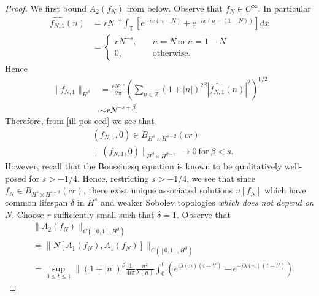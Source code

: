 \documentclass[12pt,reqno]{amsart}
\numberwithin{equation}{section}  %
\newcommand{\zz}{\mathbb{Z}}
\newcommand{\ci}{\mathbb{T}}
\newcommand{\wh}{\widehat}
\begin{document}
%
%
%
%
%
%
%
\begin{proof}
  We first bound $A_{2}(f_{N})$ from below.
  Observe that $f_{N} \in C^{\infty}$. In particular
%
%
\begin{equation}
  \label{ill-pos-ce}
\begin{split}
  \wh{f_{N,1}}(n)
  & = r N^{-s}\int_{\ci} [e^{-ix(n - N)} + e^{-ix(n - (1-N))}]  dx  
  \\ 
  & = 
  \begin{cases}
    r N^{-s},  \quad  & n = N \ \text{or} \ n = 1-N
    \\
     0, \quad  & \text{otherwise}.
  \end{cases}
\end{split}
\end{equation}
%
Hence
%
%
\begin{equation}
  \label{ill-pos-ced}
\begin{split}
  \| f_{N,1} \|_{H^{\beta}}
  & = \frac{rN^{-s}}{2 \pi} \left( \sum_{n \in \zz} (1 + | n |)^{2 \beta} |
  \wh{f_{N,1}}(n) |^{2} \right)^{1/2}
  \\
  & \sim rN^{-s + \beta}.
\end{split}
\end{equation}
%
%
Therefore, from \eqref{ill-pos-ced} we see that 
\begin{equation*}
  \begin{split}
    & (f_{N,1}, 0) \in B_{H^{s} \times H^{s-2}}(cr)  
    \\
    & \|(f_{N,1}, 0)\|_{H^{\beta} \times H^{\beta -2}} \to 0 \ \text{for} \ \beta < s.
    \end{split}
\end{equation*}
However, recall that the Boussinesq equation is known to be qualitatively well-posed for $s > -1/4$. Hence, restricting $s > -1/4$, we see that since $f_{N} \in B_{H^{s} \times H^{s-2}}(cr)$, there exist unique associated 
solutions $u[f_{N}]$ which have common lifespan $\delta$ in $H^{s}$ and weaker Sobolev topologies \emph{which does not depend
on $N$}. Choose $r$ sufficiently small such that $\delta =1$.  
Observe that
%
%
\begin{equation*}
\begin{split}
& \| A_{2}(f_{N}) \|_{C([0, 1], H^{\beta})} 
\\
  &  =  \| N[A_{1}(f_{N}), A_{1}(f_{N})] \|_{C([0, 1],
  H^{\beta})} 
  \\
  & = \sup_{0 \le t \le 1} \|  (1 + | n |)^{\beta}
  \frac{1}{4 i \pi} \frac{n^{2}}{\lambda(n)}
  \int_{0}^{t} \left( e^{i\lambda(n)(t-t')} - e^{-i\lambda(n)(t-t')} \right)

\end{split}
\end{equation*}
\end{proof}
\end{document}
